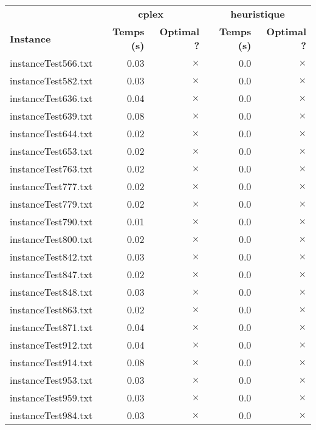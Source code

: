 \documentclass{article}
\begin{document}
\newpage
\begin{center}
\renewcommand{\arraystretch}{1.4} 
 \begin{tabular}{lrrrr}
	\hline
 & \multicolumn{2}{c}{\textbf{cplex}} & \multicolumn{2}{c}{\textbf{heuristique}}\\
\textbf{Instance}  & \textbf{Temps (s)} & \textbf{Optimal ?}  & \textbf{Temps (s)} & \textbf{Optimal ?} \\\hline

instanceTest566.txt & 0.03 & 
$\times$
 & 0.0 & 
$\times$
\\
instanceTest582.txt & 0.03 & 
$\times$
 & 0.0 & 
$\times$
\\
instanceTest636.txt & 0.04 & 
$\times$
 & 0.0 & 
$\times$
\\
instanceTest639.txt & 0.08 & 
$\times$
 & 0.0 & 
$\times$
\\
instanceTest644.txt & 0.02 & 
$\times$
 & 0.0 & 
$\times$
\\
instanceTest653.txt & 0.02 & 
$\times$
 & 0.0 & 
$\times$
\\
instanceTest763.txt & 0.02 & 
$\times$
 & 0.0 & 
$\times$
\\
instanceTest777.txt & 0.02 & 
$\times$
 & 0.0 & 
$\times$
\\
instanceTest779.txt & 0.02 & 
$\times$
 & 0.0 & 
$\times$
\\
instanceTest790.txt & 0.01 & 
$\times$
 & 0.0 & 
$\times$
\\
instanceTest800.txt & 0.02 & 
$\times$
 & 0.0 & 
$\times$
\\
instanceTest842.txt & 0.03 & 
$\times$
 & 0.0 & 
$\times$
\\
instanceTest847.txt & 0.02 & 
$\times$
 & 0.0 & 
$\times$
\\
instanceTest848.txt & 0.03 & 
$\times$
 & 0.0 & 
$\times$
\\
instanceTest863.txt & 0.02 & 
$\times$
 & 0.0 & 
$\times$
\\
instanceTest871.txt & 0.04 & 
$\times$
 & 0.0 & 
$\times$
\\
instanceTest912.txt & 0.04 & 
$\times$
 & 0.0 & 
$\times$
\\
instanceTest914.txt & 0.08 & 
$\times$
 & 0.0 & 
$\times$
\\
instanceTest953.txt & 0.03 & 
$\times$
 & 0.0 & 
$\times$
\\
instanceTest959.txt & 0.03 & 
$\times$
 & 0.0 & 
$\times$
\\
instanceTest984.txt & 0.03 & 
$\times$
 & 0.0 & 
$\times$
\\

\end{tabular}
\end{center}
\end{document}
